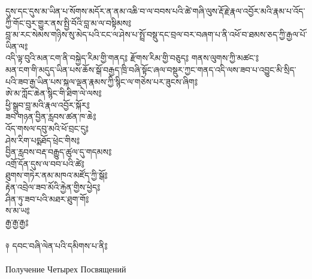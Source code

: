 {དུས་དང་དུས་མ་ཡིན་པ་སོགས་མདོར་ན་ནམ་འཆི་བ་ལ་བབས་པའི་ཚེ་གཞི་ལུས་རྡོ་རྗེ་རྣལ་འབྱོར་མའི་རྣམ་པ་འོད་ཀྱི་གོང་བུར་གྱུར་ནས་སྤྱི་བོའི་བླ་མ་ལ་བསྟིམས༔\\
བླ་མ་རང་སེམས་གཉིས་སུ་མེད་པའི་ངང་ལ་ཤེས་པ་སྤྲོ་བསྡུ་དང་བྲལ་བར་བཞག་པ་ནི་འཕོ་བ་ཐམས་ཅད་ཀྱི་རྒྱལ་པོ་ཡིན་ལ༔\\
འདི་ལྟ་བུའི་མན་ངག་ནི་བསྐྱེད་རིམ་གྱི་གནད༔ རྫོགས་རིམ་གྱི་བཅུད༔ གནས་ལུགས་ཀྱི་མཚང་༔\\
མན་ངག་གི་མདུད་ཡིན་པས་ཆོས་སྒོ་བརྒྱད་ཁྲི་བཞི་སྟོང་ཞལ་བསྡུར་ཀྱང་གནད་འདི་ལས་ཟབ་པ་འབྱུང་མི་སྲིད་པའི་ཟབ་རྒྱ་ཡིན་པས་སྐལ་ལྡན་རྣམས་ཀྱི་སྙིང་ལ་གཅེས་པར་ཟུངས་ཞིག༔\\
ཨེ་མ་ཀློང་ཆེན་སྙིང་གི་ཐིག་ལེ་ལས༔\\
ཕྱི་སྒྲུབ་བླ་མའི་རྣལ་འབྱོར་སྐོར༔\\
ཟབ་གཉན་བྱིན་རླབས་ཚན་ཁ་ཆེ༔\\
འོད་གསལ་དབུ་མའི་ཕོ་བྲང་དུ༔\\
ཤེས་རིག་པདྨཐོད་ཕྲེང་གིས༔\\
བྱིན་རླབས་བརྡ་བརྒྱུད་ཚུལ་དུ་གདམས༔\\
འགྲོ་དོན་དུས་ལ་བབ་པའི་ཚེ༔\\
ཐུགས་གཏེར་ནམ་མཁའ་མཛོད་ཀྱི་སྒོ༔\\
རྟེན་འབྲེལ་ཟབ་མོའི་རྐྱེན་གྱིས་ཕྱེད༔\\
ཤིན་ཏུ་ཟབ་པའི་མཐར་ཐུག་གོ༔\\
ས་མ་ཡ༔\\
རྒྱ་རྒྱ་རྒྱ༔\\
\\
༈ དབང་བཞི་ལེན་པའི་དམིགས་པ་ནི༔}\\
\\
\ru Получение Четырех Посвящений\\
\\
